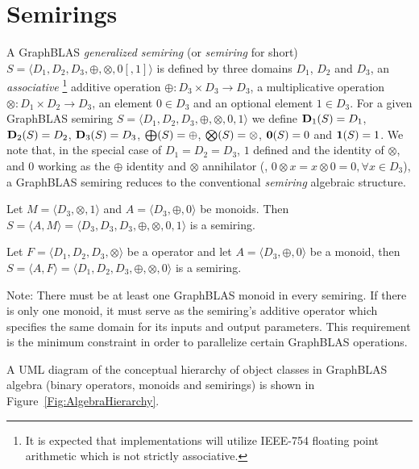 \section{Semirings}

A GraphBLAS \emph{generalized semiring} (or \emph{semiring} for short)
$S=\langle D_1,D_2,D_3,\oplus,\otimes,0 [,1] \rangle$ is defined by
three domains $D_1$, $D_2$ and $D_3$, an \emph{associative} \footnote{It 
is expected that implementations will utilize IEEE-754 floating 
point arithmetic which is not strictly associative.} 
 additive operation $\oplus :
D_3 \times D_3 \rightarrow D_3$, 
a multiplicative operation $\otimes : D_1 \times D_2 \rightarrow
D_3$, an element $0 \in D_3$ and an optional element $1 \in D_3$.
For a given GraphBLAS semiring $S=\langle D_1,
D_2, D_3,\oplus,\otimes,0,1 \rangle$ we define $\bold{D}_1(S) = D_1$,
$\bold{D}_2(S) = D_2$, $\bold{D}_3(S) = D_3$, $\bold{\bigoplus}(S) =
\oplus$, $\bold{\bigotimes}(S) = \otimes$, ${\bf 0}(S) = 0$ and ${\bf 1}(S) =
1$. We note that, in the special case of $D_1 = D_2 = D_3$, $1$ defined 
and the identity of $\otimes$, and $0$ working as the $\oplus$ identity
and $\otimes$ annihilator (\ie, $0 \otimes x = x
\otimes 0 = 0, \forall x \in D_3$), a GraphBLAS semiring reduces to the
conventional \emph{semiring} algebraic structure.

Let $M = \langle D_3, \otimes,1 \rangle$ and $A = \langle D_3,\oplus,0 \rangle$ be monoids.
Then $S= \langle A,M \rangle = \langle D_3,D_3,D_3,\oplus,\otimes,0,1 \rangle$
is a semiring.

Let $F = \langle D_1,D_2,D_3,\otimes \rangle$ be a operator
and let $A = \langle D_3,\oplus,0 \rangle$ be a monoid,
then $S= \langle A,F \rangle = \langle D_1,D_2,D_3,\oplus,\otimes,0 \rangle$
is a semiring.

Note: There must be at least one GraphBLAS monoid in every semiring. If there 
is only one monoid, it must serve as the semiring's additive operator which
specifies the same domain for its inputs and output parameters. This 
requirement is the minimum constraint in order to parallelize certain 
GraphBLAS operations.

A UML diagram of the conceptual hierarchy of object classes in GraphBLAS
algebra (binary operators, monoids and semirings) is shown in 
Figure~\ref{Fig:AlgebraHierarchy}.

